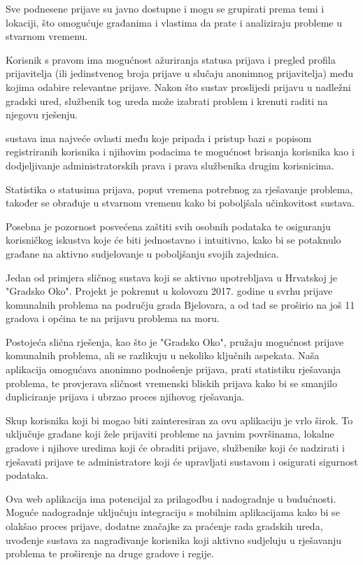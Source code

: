 \noindent Sve podnesene prijave su javno dostupne i mogu se grupirati prema temi i lokaciji, što omogućuje građanima i vlastima da prate i analiziraju probleme u stvarnom vremenu.

\noindent Korisnik s pravom  ima mogućnost ažuriranja statusa prijava i pregled profila prijavitelja (ili jedinstvenog broja prijave u slučaju anonimnog prijavitelja) među kojima odabire relevantne prijave.
\noindent Nakon što sustav proslijedi prijavu u nadležni gradski ured, službenik tog ureda može izabrati problem i krenuti raditi na njegovu rješenju.

\noindent {} sustava ima najveće ovlasti među koje pripada i pristup bazi s popisom registriranih korisnika i njihovim podacima te mogućnost brisanja korisnika kao i dodjeljivanje administratorskih prava i prava službenika drugim korisnicima.

\noindent Statistika o statusima prijava, poput vremena potrebnog za rješavanje problema, također se obrađuje u stvarnom vremenu kako bi poboljšala učinkovitost sustava.

\noindent Posebna je pozornost posvećena zaštiti svih osobnih podataka te osiguranju korisničkog iskustva koje će biti jednostavno i intuitivno, kako bi se potaknulo građane na aktivno sudjelovanje u poboljšanju svojih zajednica.

\noindent Jedan od primjera sličnog sustava koji se aktivno upotrebljava u Hrvatskoj je "Gradsko Oko". Projekt je pokrenut u kolovozu 2017. godine u svrhu prijave komunalnih problema na području grada Bjelovara, a od tad se proširio na još 11 gradova i općina te na prijavu problema na moru.

\noindent Postojeća slična rješenja, kao što je "Gradsko Oko", pružaju mogućnost prijave komunalnih problema, ali se razlikuju u nekoliko ključnih aspekata. Naša aplikacija omogućava anonimno podnošenje prijava, prati statistiku rješavanja problema, te provjerava sličnost vremenski bliskih prijava kako bi se smanjilo dupliciranje prijava i ubrzao proces njihovog rješavanja.

\noindent Skup korisnika koji bi mogao biti zainteresiran za ovu aplikaciju je vrlo širok. To uključuje građane koji žele prijaviti probleme na javnim površinama, lokalne gradove i njihove uredima koji će obraditi prijave, službenike koji će nadzirati i rješavati prijave te administratore koji će upravljati sustavom i osigurati sigurnost podataka.

\noindent Ova web aplikacija ima potencijal za prilagodbu i nadogradnje u budućnosti. Moguće nadogradnje uključuju integraciju s mobilnim aplikacijama kako bi se olakšao proces prijave, dodatne značajke za praćenje rada gradskih ureda, uvođenje sustava za nagrađivanje korisnika koji aktivno sudjeluju u rješavanju problema te proširenje na druge gradove i regije.

